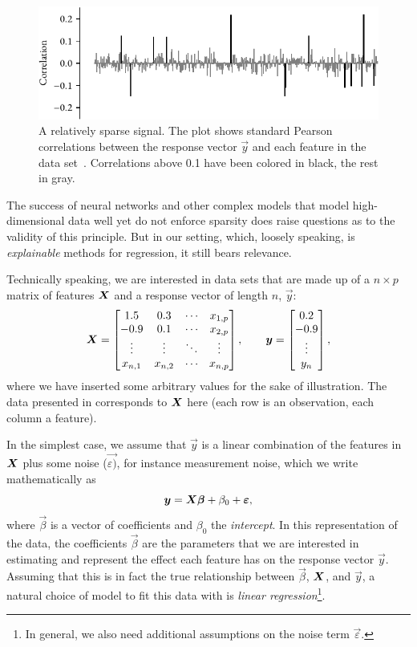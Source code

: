 \begin{figure}[htpb]
  \centering
  \includegraphics[]{figures/sparse-signal.pdf}
  \caption{%
    A relatively sparse signal. The plot shows standard Pearson correlations between the response vector \(\vec{y}\) and each feature in the  data set~\parencite{guyon2004}. Correlations above 0.1 have been colored in black, the rest in gray.
  }
  \label{fig:sparse-signal}
\end{figure}

The success of neural networks and other complex models that model high-dimensional data well yet do not enforce sparsity does raise questions as to the validity of this principle. But in our setting, which, loosely speaking, is \emph{explainable} methods for regression, it still bears relevance.

Technically speaking, we are interested in data sets that are made up of a \(n \times p\) matrix of features \(\boldsymbol{X}\) and a response vector of length \(n\), \(\vec{y}\):
\[
  \boldsymbol{X} = \begin{bmatrix}
    1.5     & 0.3     & \cdots & x_{1,p} \\
    -0.9    & 0.1     & \cdots & x_{2,p} \\
    \vdots  & \vdots  & \ddots & \vdots  \\
    x_{n,1} & x_{n,2} & \cdots & x_{n,p} \\
  \end{bmatrix},\qquad
  \boldsymbol{y} = \begin{bmatrix}0.2 \\ -0.9 \\ \vdots \\ y_n\end{bmatrix},
\]
where we have inserted some arbitrary values for the sake of illustration. The data presented in  corresponds to \(\boldsymbol{X}\) here (each row is an observation, each column a feature).

In the simplest case, we assume that \(\vec{y}\) is a linear combination of the features in \(\boldsymbol{X}\) plus some noise (\(\vec{\varepsilon)}\), for instance measurement noise, which we write mathematically as
\[
  \boldsymbol{y} = \boldsymbol{X}\boldsymbol{\beta} + \beta_0 + \boldsymbol{\varepsilon},
\]
where \(\vec{\beta}\) is a vector of coefficients and \(\beta_0\) the \emph{intercept}. In this representation of the data, the coefficients \(\vec{\beta}\) are the parameters that we are interested in estimating and represent the effect each feature has on the response vector \(\vec{y}\).
Assuming that this is in fact the true relationship between \(\vec{\beta}\), \(\boldsymbol{X}\), and \(\vec{y}\), a natural choice of model to fit this data with is \emph{linear regression}\footnote{In general, we also need additional assumptions on the noise term \(\vec{\varepsilon}\).}.

